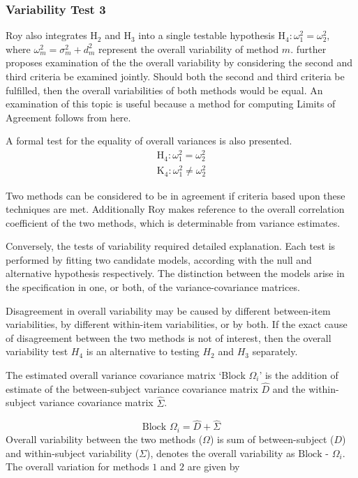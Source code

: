 \documentclass[12pt, a4paper]{report}
\theoremstyle{plain}
\theoremstyle{definition}
\theoremstyle{remark}
\begin{document}
	
	\subsubsection{Variability Test 3}
	Roy also integrates $\mathrm{H}_2$ and $\mathrm{H}_3$ into a single testable hypothesis $\mathrm{H}_4\colon \omega^2_1=\omega^2_2,$ where $\omega^2_m = \sigma^2_m + d^2_m$ represent the overall variability of method $m.$ \citet{ARoy2009} further proposes examination of the the overall variability by considering the second and third criteria be examined jointly. Should both the second and third criteria be fulfilled, then the overall variabilities of both methods would be equal. An examination of this topic is useful because a method for computing Limits of Agreement follows from here.
	
	A formal test for the equality of overall variances is also presented.
	\begin{eqnarray*}
		\operatorname{H_4} : \omega^2_1 = \omega^2_2 \\
		\operatorname{K_4} : \omega^2_1 \neq \omega^2_2
	\end{eqnarray*}
	
	Two methods can be considered to be in agreement if criteria based upon these techniques are met. Additionally Roy makes reference to the overall correlation coefficient of the two methods, which is determinable from variance estimates.
	
	Conversely, the tests of variability required detailed explanation. Each test is performed by fitting two candidate models, according with the null and alternative hypothesis respectively. The distinction between the models arise in the specification in one, or both, of the variance-covariance matrices. %
	
	
	
	Disagreement in overall variability may be caused by different between-item variabilities, by different within-item variabilities, or by both.  If the exact cause of disagreement between the two methods is not of interest, then the overall variability test $H_4$ is an alternative to testing $H_2$ and $H_3$ separately.
	
	The estimated overall variance covariance matrix `Block
	$\Omega_{i}$' is the addition of estimate of the between-subject variance covariance matrix $\hat{D}$ and the within-subject variance covariance matrix $\hat{\Sigma}$.
	
	\begin{equation}
	\mbox{Block  }\Omega_{i} = \hat{D} + \hat{\Sigma}
	\end{equation}
	Overall variability between the two methods ($\Omega$) is sum of between-subject ($D$) and within-subject variability ($\Sigma$),
	\citet{ARoy2009} denotes the overall variability	as ${\mbox{Block - } \Omega_{i}}$. The overall variation for methods $1$ and $2$ are given by
	
\end{document}
